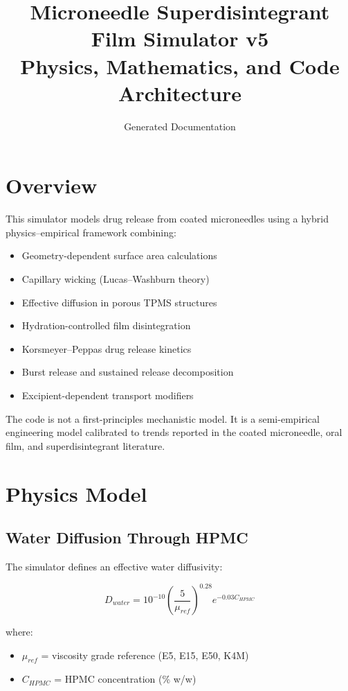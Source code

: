 \documentclass[11pt]{article}
\title{Microneedle Superdisintegrant Film Simulator v5\\Physics, Mathematics, and Code Architecture}
\author{Generated Documentation}
\date{}
\begin{document}
\maketitle

\tableofcontents

\section{Overview}

This simulator models drug release from coated microneedles using a hybrid physics--empirical framework combining:

\begin{itemize}
\item Geometry-dependent surface area calculations
\item Capillary wicking (Lucas--Washburn theory)
\item Effective diffusion in porous TPMS structures
\item Hydration-controlled film disintegration
\item Korsmeyer--Peppas drug release kinetics
\item Burst release and sustained release decomposition
\item Excipient-dependent transport modifiers
\end{itemize}

The code is not a first-principles mechanistic model. It is a semi-empirical engineering model calibrated to trends reported in the coated microneedle, oral film, and superdisintegrant literature.

\section{Physics Model}

\subsection{Water Diffusion Through HPMC}

The simulator defines an effective water diffusivity:

\begin{equation}
D_{water}
=10^{-10}
\left(\frac{5}{\mu_{ref}}\right)^{0.28}
e^{-0.03C_{HPMC}}
\end{equation}

where:

\begin{itemize}
\item $\mu_{ref}$ = viscosity grade reference (E5, E15, E50, K4M)
\item $C_{HPMC}$ = HPMC concentration (\% w/w)
\end{itemize}
\end{document}
